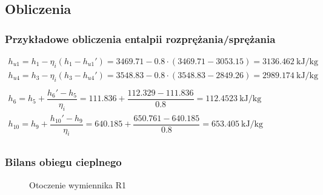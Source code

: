\subsection{Obliczenia}

\renewcommand{\arraystretch}{1.5}

\subsubsection{Przykładowe obliczenia entalpii rozprężania/sprężania}

\begin{math}
	\begin{array}{l}
		h_{u1} = h_1 - \eta_i ( h_1 - h_{u1}' ) =
			\num{3469,71} - \num{0,8} \cdot ( \num{3469,71} - \num{3053,15} ) =
			\SI{3136,462}{\kilo\joule\per\kilogram} \\
		h_{u4} = h_3 - \eta_i ( h_3 - h_{u4}' ) =
			\num{3548,83} - \num{0,8} \cdot ( \num{3548,83} - \num{2849,26} ) =
			\SI{2989,174}{\kilo\joule\per\kilogram} \\
		\\
		h_6 = h_5 + \dfrac{h_6' - h_5}{\eta_i} =
			\num{111,836} + \dfrac{\num{112,329} - \num{111,836}}{\num{0,8}} =
			\SI{112,4523}{\kilo\joule\per\kilogram} \\
		h_{10} = h_9 + \dfrac{h_{10}' - h_9}{\eta_i} =
			\num{640,185} + \dfrac{\num{650,761} - \num{640,185}}{\num{0,8}} =
			\SI{653,405}{\kilo\joule\per\kilogram} \\
	\end{array}
\end{math}

\clearpage
\subsubsection{Bilans obiegu cieplnego}

\begin{figure}[H]
	\centering

	\caption{Otoczenie wymiennika R1}
\end{figure}

